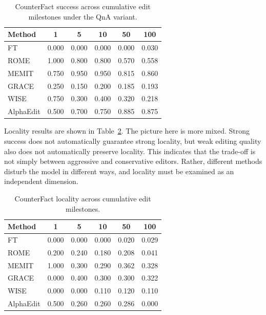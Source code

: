 \begin{table}[H]
    \centering
    \caption{CounterFact success across cumulative edit milestones under the QnA variant.}
    \label{tab:cfact_success_qna}
    \begin{tabular}{lccccc}
        \toprule
        Method & 1 & 5 & 10 & 50 & 100 \\
        \midrule
        FT & 0.000 & 0.000 & 0.000 & 0.000 & 0.030 \\
        ROME & 1.000 & 0.800 & 0.800 & 0.570 & 0.558 \\
        MEMIT & 0.750 & 0.950 & 0.950 & 0.815 & 0.860 \\
        GRACE & 0.250 & 0.150 & 0.200 & 0.185 & 0.193 \\
        WISE & 0.750 & 0.300 & 0.400 & 0.320 & 0.218 \\
        AlphaEdit & 0.500 & 0.700 & 0.750 & 0.885 & 0.875 \\
        \bottomrule
    \end{tabular}
\end{table}

Locality results are shown in Table~\ref{tab:cfact_locality}. The picture here is more mixed. Strong success does not automatically guarantee strong locality, but weak editing quality also does not automatically preserve locality. This indicates that the trade-off is not simply between aggressive and conservative editors. Rather, different methods disturb the model in different ways, and locality must be examined as an independent dimension.

\begin{table}[H]
    \centering
    \caption{CounterFact locality across cumulative edit milestones.}
    \label{tab:cfact_locality}
    \begin{tabular}{lccccc}
        \toprule
        Method & 1 & 5 & 10 & 50 & 100 \\
        \midrule
        FT & 0.000 & 0.000 & 0.000 & 0.020 & 0.029 \\
        ROME & 0.200 & 0.240 & 0.180 & 0.208 & 0.041 \\
        MEMIT & 1.000 & 0.300 & 0.290 & 0.362 & 0.328 \\
        GRACE & 0.000 & 0.400 & 0.300 & 0.300 & 0.322 \\
        WISE & 0.000 & 0.000 & 0.110 & 0.120 & 0.110 \\
        AlphaEdit & 0.500 & 0.260 & 0.260 & 0.286 & 0.000 \\
        \bottomrule
    \end{tabular}
\end{table}

